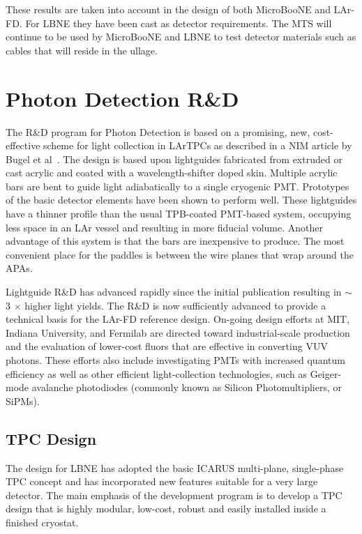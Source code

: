 These results are taken into account in the design of both MicroBooNE and LAr-FD. For LBNE they have been cast as detector requirements. The MTS will continue to be used by MicroBooNE and LBNE to test detector materials such as cables that will reside in the ullage.


\section{Photon Detection R\&D}


The R\&D program  for Photon Detection is based on a promising, new, cost-effective scheme for light collection in LArTPCs as described in a NIM article by Bugel et al~\cite{lightGuides}. The design is based upon lightguides fabricated from extruded or cast acrylic and coated with a wavelength-shifter doped skin.  Multiple acrylic bars are bent to guide light adiabatically to a single cryogenic PMT. Prototypes of the basic detector elements have been shown to perform well.  These lightguides have a thinner profile than the usual TPB-coated PMT-based system, occupying less space in an LAr vessel and resulting in more fiducial volume.  Another advantage of this system is that the bars are inexpensive to produce. The most convenient place for the paddles is between the wire planes that wrap around the APAs.

Lightguide R\&D has advanced rapidly since the initial publication resulting in $\sim$3 $\times$ higher light yields. The R\&D is now sufficiently advanced to provide a technical basis for the LAr-FD reference design. On-going design efforts at MIT, Indiana University, and Fermilab are directed toward industrial-scale production and the evaluation of lower-cost fluors that are effective in converting VUV photons. These efforts also include investigating PMTs with increased quantum efficiency as well as other efficient light-collection technologies, such as Geiger-mode avalanche photodiodes (commonly known as Silicon Photomultipliers, or SiPMs).

\subsection{TPC Design}
The design for LBNE has adopted the basic ICARUS multi-plane, single-phase TPC
concept and has incorporated new features suitable for a very large
detector.  The main emphasis of the development program is to develop a TPC design that is highly modular, low-cost, robust and easily installed inside a finished cryostat.

